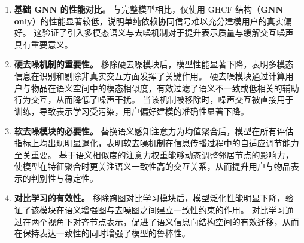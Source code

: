 \begin{enumerate}
    \item \textbf{基础 GNN 的性能对比。}  
    与完整模型相比，仅使用 GHCF 结构（\textbf{GNN only}）的性能显著较低，说明单纯依赖协同信号难以充分建模用户的真实偏好。  
    这验证了引入多模态语义与去噪机制对于提升表示质量与缓解交互噪声具有重要意义。

    \item \textbf{硬去噪机制的重要性。}  
    移除硬去噪模块后，模型性能显著下降，表明多模态信息在识别和剔除非真实交互方面发挥了关键作用。  
    硬去噪模块通过计算用户与物品在语义空间中的模态相似度，有效过滤了语义不一致或低相关的辅助行为交互，从而降低了噪声干扰。  
    当该机制被移除时，噪声交互被直接用于训练，导致表示学习受污染，用户偏好建模的准确性显著下降。

    \item \textbf{软去噪模块的必要性。}  
    替换语义感知注意力为均值聚合后，模型在所有评估指标上均出现明显退化，表明软去噪机制在信息传播过程中的自适应调节能力至关重要。  
    基于语义相似度的注意力权重能够动态调整邻居节点的影响力，使模型在特征聚合时更关注语义一致性高的交互关系，从而提升用户与物品表示的判别性与稳定性。

    \item \textbf{对比学习的有效性。}  
    移除跨图对比学习模块后，模型泛化性能明显下降，验证了该模块在语义增强图与去噪图之间建立一致性约束的作用。  
    对比学习通过在两个视角下对齐节点表示，促进了语义信息向结构空间的有效迁移，从而在保持表达一致性的同时增强了模型的鲁棒性。
\end{enumerate}


\begin{table}[h]
\centering
\caption{消融实验结果（Tmall-Rec 数据集）}
\label{table:ablation2}
\end{table}


